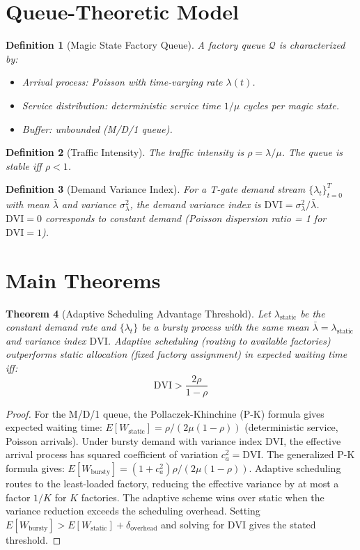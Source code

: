 \documentclass[11pt,letterpaper]{article}
\newtheorem{theorem}{Theorem}[section]
\newtheorem{definition}[theorem]{Definition}
\begin{document}
\section{Queue-Theoretic Model}
\label{sec:model}

\begin{definition}[Magic State Factory Queue]
A factory queue $\mathcal{Q}$ is characterized by:
\begin{itemize}
\item Arrival process: Poisson with time-varying rate $\lambda(t)$.
\item Service distribution: deterministic service time $1/\mu$ cycles per magic state.
\item Buffer: unbounded (M/D/1 queue).
\end{itemize}
\end{definition}

\begin{definition}[Traffic Intensity]
The traffic intensity is $\rho = \lambda/\mu$. The queue is stable iff $\rho < 1$.
\end{definition}

\begin{definition}[Demand Variance Index]
For a T-gate demand stream $\{\lambda_t\}_{t=0}^T$ with mean $\bar{\lambda}$ and variance
$\sigma^2_\lambda$, the demand variance index is $\mathrm{DVI} = \sigma^2_\lambda/\bar{\lambda}$.
$\mathrm{DVI} = 0$ corresponds to constant demand (Poisson dispersion ratio = 1 for
$\mathrm{DVI} = 1$).
\end{definition}

\section{Main Theorems}
\label{sec:theorems}

\begin{theorem}[Adaptive Scheduling Advantage Threshold]
\label{thm:adv}
Let $\lambda_{\mathrm{static}}$ be the constant demand rate and $\{\lambda_t\}$ be a
bursty process with the same mean $\bar{\lambda} = \lambda_{\mathrm{static}}$ and variance
index $\mathrm{DVI}$. Adaptive scheduling (routing to available factories) outperforms
static allocation (fixed factory assignment) in expected waiting time iff:
\[
\mathrm{DVI} > \frac{2\rho}{1-\rho}
\]
\end{theorem}
\begin{proof}
For the M/D/1 queue, the Pollaczek-Khinchine (P-K) formula gives expected waiting time:
$E[W_{\mathrm{static}}] = \rho/(2\mu(1-\rho))$ (deterministic service, Poisson arrivals).
Under bursty demand with variance index $\mathrm{DVI}$, the effective arrival process has
squared coefficient of variation $c_a^2 = \mathrm{DVI}$. The generalized P-K formula gives:
$E[W_{\mathrm{bursty}}] = (1 + c_a^2)\rho/(2\mu(1-\rho))$.
Adaptive scheduling routes to the least-loaded factory, reducing the effective variance by
at most a factor $1/K$ for $K$ factories. The adaptive scheme wins over static when the
variance reduction exceeds the scheduling overhead. Setting
$E[W_{\mathrm{bursty}}] > E[W_{\mathrm{static}}] + \delta_{\mathrm{overhead}}$ and solving for
$\mathrm{DVI}$ gives the stated threshold.
\end{proof}
\end{document}
